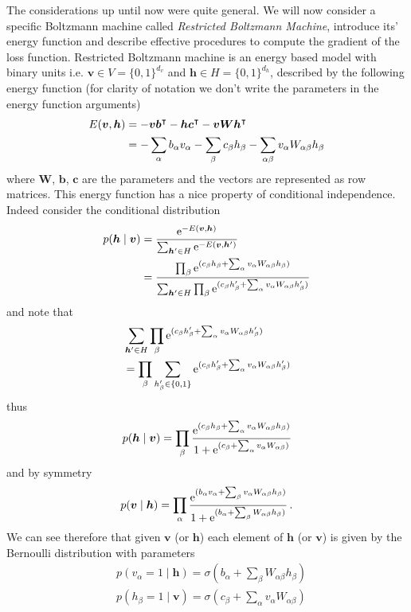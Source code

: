 \documentclass{myclass}
\begin{document}
The considerations up until now were quite general. We will now consider a specific Boltzmann
machine called \emph{Restricted Boltzmann Machine}, introduce its' energy function and describe
effective procedures to compute the gradient of the loss function. Restricted Boltzmann machine is an
energy based model with binary units i.e. \(\bm{v} \in V = \{0,1\}^{d_v}\) and \(\bm{h} \in H =
\{0,1\}^{d_h}\), described by the following energy function (for clarity of notation we don't write
the parameters in the energy function arguments)
\[
\begin{split}
   E(\bm{v}, \bm{h}) &= -\bm{v}\bm{b}^\intercal - \bm{h}\bm{c}^\intercal - \bm{v}\bm{W}\bm{h}^\intercal \\
                     &= -\sum_{\alpha} b_\alpha v_\alpha -\sum_{\beta} c_\beta h_\beta - \sum_{\alpha\beta} v_\alpha W_{\alpha\beta} h_\beta
\end{split}
\]
where \(\bm{W}\), \(\bm{b}\), \(\bm{c}\) are the parameters and the vectors are represented as row
matrices. This energy function has a nice property of conditional independence. Indeed consider the
conditional distribution
\[
\begin{split}
   p(\bm{h} \mid \bm{v}) &= \frac{\mathrm{e}^{-E(\bm{v},\bm{h})}}{\sum_{\bm{h}' \in H} \mathrm{e}^{-E(\bm{v}, \bm{h}')}} \\
   &= \frac{\prod_\beta \mathrm{e}^{(c_\beta h_\beta + \sum_\alpha v_\alpha W_{\alpha\beta} h_\beta)}}{ \sum_{\bm{h}' \in H} \prod_\beta \mathrm{e}^{(c_\beta h'_\beta + \sum_\alpha v_\alpha W_{\alpha\beta} h'_\beta)}}
\end{split}
\]
and note that
\[
\begin{split}
   &\sum_{\bm{h}' \in H} \prod_\beta \mathrm{e}^{(c_\beta h'_\beta + \sum_\alpha v_\alpha W_{\alpha\beta} h'_\beta)} \\
   &= \prod_\beta \sum_{h'_\beta \in \{0,1\}} \mathrm{e}^{(c_\beta h'_\beta + \sum_\alpha v_\alpha W_{\alpha\beta} h'_\beta)}
\end{split}
\]
thus
\[
   p(\bm{h} \mid \bm{v}) = \prod_\beta \frac{\mathrm{e}^{(c_\beta h_\beta + \sum_\alpha v_\alpha W_{\alpha\beta} h_\beta)}}{1 + \mathrm{e}^{(c_\beta + \sum_\alpha v_\alpha W_{\alpha\beta})}}
\]
and by symmetry
\[
   p(\bm{v} \mid \bm{h}) = \prod_\alpha \frac{\mathrm{e}^{(b_\alpha v_\alpha + \sum_\beta v_\alpha W_{\alpha\beta} h_\beta)}}{1 + \mathrm{e}^{(b_\alpha + \sum_\beta  W_{\alpha\beta} h_\beta)}}\,.
\]
We can see therefore that given \(\bm{v}\) (or \(\bm{h}\)) each element of \(\bm{h}\) (or \(\bm{v}\))
is given by the Bernoulli distribution with parameters
\[
\begin{split}
   &p(v_\alpha = 1 \mid \bm{h}) = \sigma\left( b_\alpha + \sum_\beta W_{\alpha\beta}h_\beta \right)\\
   &p(h_\beta = 1 \mid \bm{v}) = \sigma\left( c_\beta + \sum_\alpha v_\alpha W_{\alpha\beta} \right)\\
\end{split}
\]
\end{document}
